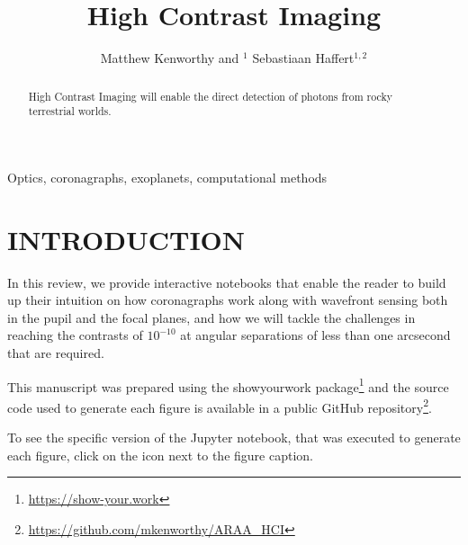 \documentclass[letterpaper]{ar-1col}
\newcommand{\project}[1]{\textsf{#1}}
\begin{document}


\title{High Contrast Imaging}

\author{Matthew Kenworthy and $^1$ Sebastiaan Haffert$^{1,2}$
  }

\begin{abstract}
High Contrast Imaging will enable the direct detection of photons from rocky terrestrial worlds.
\end{abstract}

\begin{keywords}
 Optics, coronagraphs, exoplanets, computational methods

\end{keywords}
\maketitle

\tableofcontents

\section{INTRODUCTION}
\label{sec:intro}



In this review, we provide interactive notebooks that enable the reader to build up their intuition on how coronagraphs work along with wavefront sensing both in the pupil and the focal planes, and how we will tackle the challenges in reaching the contrasts of $10^{-10}$ at angular separations of less than one arcsecond that are required.

This manuscript was prepared using the \project{showyourwork} package\footnote{\url{https://show-your.work}} and the source code used to generate each figure is available in a public \project{GitHub} repository\footnote{\url{https://github.com/mkenworthy/ARAA_HCI}}.

To see the specific version of the \project{Jupyter} notebook, that was executed to generate each figure, click on the icon next to the figure caption.
\end{document}
